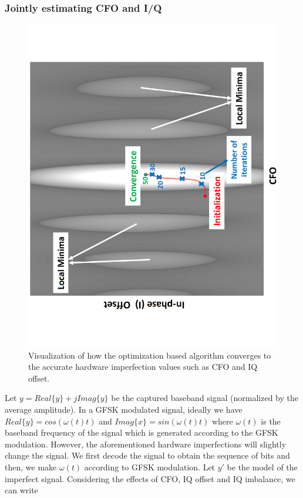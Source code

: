 \subsubsection{Jointly estimating CFO and I/Q}
\begin{figure}[t!]
    \centering
    \includegraphics[angle = 270, width = \linewidth]{plots/heatmap.pdf} 
    \caption{Visualization of how the optimization based algorithm converges to the accurate hardware imperfection values such as CFO and IQ offset.}
    \label{fig:heatmap}
\end{figure}
Let $y = Real\{y\}+jImag\{y\}$ be the captured baseband signal (normalized by the average amplitude). In a GFSK modulated signal, ideally we have $Real\{y\} = cos(\omega(t)t)$ and $Imag\{x\} = sin(\omega(t)t)$ where $\omega(t)$ is the baseband frequency of the signal which is generated according to the GFSK modulation. However, the aforementioned hardware imperfections will slightly change the signal. We first decode the signal to obtain the sequence of bits and then, we make $\omega(t)$ according to GFSK modulation. Let $y'$ be the model of the imperfect signal. Considering the effects of CFO, IQ offset and IQ imbalance, we can write
